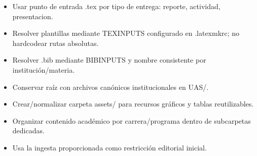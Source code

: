 \documentclass[12pt]{article}
\begin{document}
\begin{itemize}[leftmargin=*]
  \item Usar punto de entrada .tex por tipo de entrega: reporte, actividad, presentacion.
  \item Resolver plantillas mediante TEXINPUTS configurado en .latexmkrc; no hardcodear rutas absolutas.
  \item Resolver .bib mediante BIBINPUTS y nombre consistente por institución/materia.
  \item Conservar raíz con archivos canónicos institucionales en UAS/.
  \item Crear/normalizar carpeta assets/ para recursos gráficos y tablas reutilizables.
  \item Organizar contenido académico por carrera/programa dentro de subcarpetas dedicadas.
  \item Usa la ingesta proporcionada como restricción editorial inicial.
\end{itemize}
\end{document}
